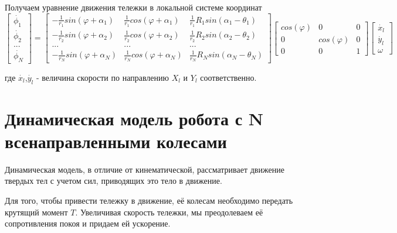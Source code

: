 \documentclass[oneside,final,14pt]{extreport}
\begin{document}
Получаем уравнение движения тележки в локальной системе координат
\begin{equation}
\begin{bmatrix}
\dot{\phi_{1}} \\
\dot{\phi_{2}} \\
...\\
\dot{\phi_{N}}
\end{bmatrix}
=
\begin{bmatrix}
-\frac{1}{r_{1}}sin(\varphi +\alpha_{1}) &
\frac{1}{r_{1}}cos(\varphi +\alpha_{1}) &
\frac{1}{r_{1}}R_{1}sin(\alpha_{1} - \theta_{1})
\\
-\frac{1}{r_{2}}sin(\varphi +\alpha_{2}) &
\frac{1}{r_{2}}cos(\varphi +\alpha_{2}) &
\frac{1}{r_{2}}R_{2}sin(\alpha_{2} - \theta_{2})
\\
... & ... & ...
\\
-\frac{1}{r_{N}}sin(\varphi +\alpha_{N}) &
\frac{1}{r_{N}}cos(\varphi +\alpha_{N}) &
\frac{1}{r_{N}}R_{N}sin(\alpha_{N} - \theta_{N})
\end{bmatrix}
\begin{bmatrix}
cos(\varphi) & 0 & 0 \\
0 & cos(\varphi) & 0 \\
0 & 0 & 1
\end{bmatrix}
\begin{bmatrix}
\dot{x_{l}} \\
\dot{y_{l}} \\
\omega
\end{bmatrix}
\end{equation}

где $\dot{x_{l}}$,$\dot{y_{l}}$ - величина скорости по направлению $X_{l}$ и  $Y_{l}$ соответственно.
\fi

\chapter{Динамическая модель робота с N всенаправленными колесами}
Динамическая модель, в отличие от кинематической, рассматривает движение твердых тел с учетом сил, приводящих это тело в движение.
 
Для того, чтобы привести тележку в движение, её колесам необходимо передать крутящий момент $T$. Увеличивая скорость тележки, мы преодолеваем её сопротивления покоя и придаем ей ускорение. 
 
\end{document}
